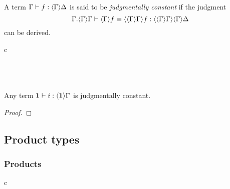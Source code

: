 \begin{defn}
A term $\jhom{\Gamma}{\Delta}{f}$ is said to be \emph{judgmentally constant} if
the judgment
\begin{equation*}
\jtermeq{\ctxext{\Gamma}{\ctxwk{\Gamma}{\Gamma}}}{\ctxwk{{\Gamma}{\Gamma}}{{\Gamma}{\Delta}}}{\ctxwk{\Gamma}{f}}{\ctxwk{{\Gamma}{\Gamma}}{f}}
\end{equation*}
can be derived.
\end{defn}

\begin{defn}
\begin{infarray}{c}
\inference{\jctx{\Gamma}}{\jctx{\tau\Gamma}}\\
\\
\\
\\
{}
\end{infarray}
\end{defn}

\begin{lem}
Any term $\jhom{\unit}{\Gamma}{i}$ is judgmentally constant.
\end{lem}

\begin{proof}

\end{proof}

\subsection{Product types}

\subsubsection{Products}
\begin{infarray}{c}
\inference{\jctx{\Gamma}\qquad\jctx{\Delta}}{\jctx{\product{\Gamma}{\Delta}}}\\
\inference{\jctx{\Gamma}\qquad\jctx{\Delta}}{\jhom{{\Gamma}{\Delta}}{\product{\Gamma}{\Delta}}{\pair}}
\end{infarray}

